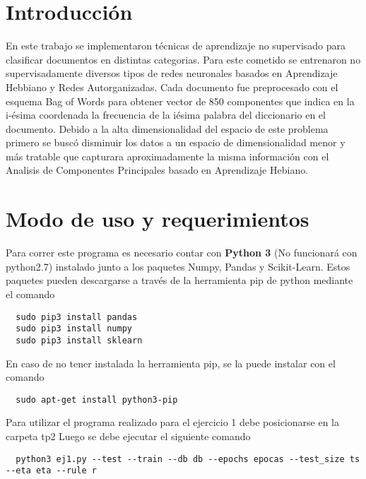 \section{Introducción}

En este trabajo se implementaron técnicas de aprendizaje no supervisado para
clasificar documentos en distintas categorias. Para este cometido se entrenaron no
supervisadamente diversos tipos de redes neuronales basados en Aprendizaje Hebbiano y
Redes Autorganizadas. Cada documento fue preprocesado con el esquema Bag of
Words para obtener vector de 850 componentes que indica en la i-ésima coordenada
la frecuencia de la iésima palabra del diccionario en el documento.
Debido a la alta dimensionalidad del espacio de este problema primero se buscó
disminuir los datos a un espacio de dimensionalidad menor y más tratable que
capturara aproximadamente la misma información con el Analisis de Componentes
Principales basado en Aprendizaje Hebiano.


\section{Modo de uso y requerimientos}
Para correr este programa es necesario contar con \textbf{Python 3} (No funcionará con python2.7) instalado junto a los paquetes Numpy, Pandas y Scikit-Learn. Estos paquetes pueden descargarse a través
de la herramienta pip de python mediante el comando
\begin{verbatim}
  sudo pip3 install pandas
  sudo pip3 install numpy
  sudo pip3 install sklearn
\end{verbatim}
En caso de no tener instalada la herramienta pip, se la puede instalar con el comando
\begin{verbatim}
  sudo apt-get install python3-pip
\end{verbatim}

Para utilizar el programa realizado para el ejercicio 1 debe posicionarse en la carpeta tp2 Luego se debe ejecutar el siguiente comando
\begin{verbatim}
  python3 ej1.py --test --train --db db --epochs epocas --test_size ts --eta eta --rule r
\end{verbatim}

